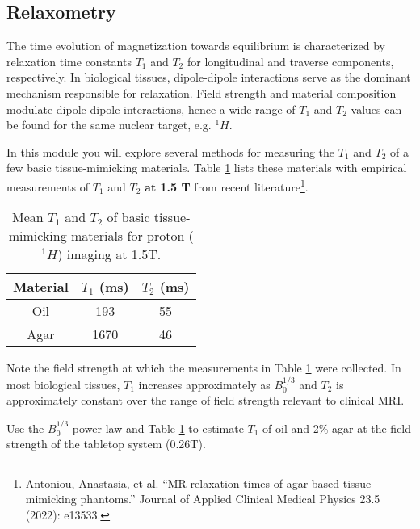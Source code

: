 \newpage
\subsection{Relaxometry} \label{sec:relax}

The time evolution of magnetization towards equilibrium is characterized by relaxation time constants $T_1$ and $T_2$ for longitudinal and traverse components, respectively. In biological tissues, dipole-dipole interactions serve as the dominant mechanism responsible for relaxation. Field strength and material composition modulate dipole-dipole interactions, hence a wide range of $T_1$ and $T_2$ values can be found for the same nuclear target, e.g. ${}^1 H$.

In this module you will explore several methods for measuring the $T_1$ and $T_2$ of a few basic tissue-mimicking materials. Table \ref{table:relax} lists these materials with empirical measurements of $T_1$ and $T_2$ \textbf{at 1.5 T} from recent literature\footnote{Antoniou, Anastasia, et al. ``MR relaxation times of agar‐based tissue‐mimicking phantoms.'' Journal of Applied Clinical Medical Physics 23.5 (2022): e13533.}.

\begin{table}[!h]
\begin{center}
\begin{tabular}{ |c|c|c| } 
\hline
\textbf{Material} & \textbf{$T_1$ (ms)} & \textbf{$T_2$ (ms)} \\ \hline
Oil & 193 & 55 \\ \hline
Agar & 1670 & 46 \\ \hline
\end{tabular}
\end{center}
\caption{\label{table:relax} Mean $T_1$ and $T_2$ of basic tissue-mimicking materials for proton (${}^1 H$) imaging at 1.5T.}
\end{table}

Note the field strength at which the measurements in Table \ref{table:relax} were collected. In most biological tissues, $T_1$ increases approximately as $B_0^{1/3}$ and $T_2$ is approximately constant over the range of field strength relevant to clinical MRI.

\vspace{5mm}

\color{red} Use the $B_0^{1/3}$ power law and Table \ref{table:relax} to estimate $T_1$ of oil and 2\% agar at the field strength of the tabletop system (0.26T).
\color{black}

